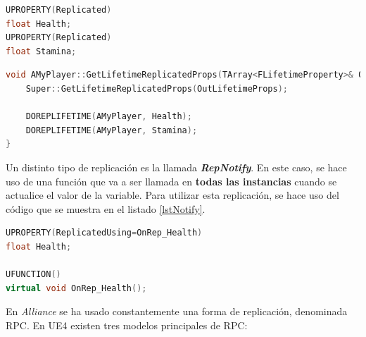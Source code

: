 \begin{lstlisting}[language=c++,caption={Fichero de cabecera al replicar una propiedad},captionpos=b,label={LstHeaderRep}]
UPROPERTY(Replicated)
float Health;
UPROPERTY(Replicated)
float Stamina;
\end{lstlisting}

\begin{lstlisting}[language=c++,caption={Fichero fuente al replicar una propiedad},captionpos=b,label={LstSourceRep}]
void AMyPlayer::GetLifetimeReplicatedProps(TArray<FLifetimeProperty>& OutLifetimeProps) const {
    Super::GetLifetimeReplicatedProps(OutLifetimeProps);

    DOREPLIFETIME(AMyPlayer, Health);
    DOREPLIFETIME(AMyPlayer, Stamina);
}
\end{lstlisting}

Un distinto tipo de replicación es la llamada \textbf{\textit{RepNotify}}. En este caso, se hace uso de una función que va a ser llamada en \textbf{todas las instancias} cuando se actualice el valor de la variable. Para utilizar esta replicación, se hace uso del código que se muestra en el listado \ref{lstNotify}.

\begin{lstlisting}[language=c++,caption={Replicación de propiedades con RepNotify},captionpos=b,label={lstNotify}]
UPROPERTY(ReplicatedUsing=OnRep_Health)
float Health;

UFUNCTION()
virtual void OnRep_Health();
\end{lstlisting}

En \textit{Alliance} se ha usado constantemente una forma de replicación, denominada \ac{RPC}. En \ac{UE4} existen tres modelos principales de \ac{RPC}:

